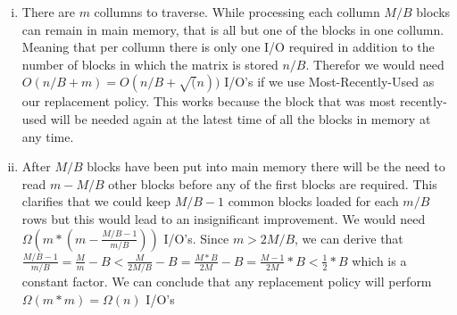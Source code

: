 \begin{enumerate}[(i)]
	\item
There are $m$ collumns to traverse. While processing each collumn $M/B$ blocks can remain in main memory, that is all but one of the blocks in one collumn. Meaning that per collumn there is only one I/O required in addition to the number of blocks in which the matrix is stored $n/B$. Therefor we would need $O(n/B + m) = O(n/B + \sqrt(n))$ I/O's if we use Most-Recently-Used as our replacement policy. This works because the block that was most recently-used will be needed again at the latest time of all the blocks in memory at any time.

	\item
After $M/B$ blocks have been put into main memory there will be the need to read $m - M/B$ other blocks before any of the first blocks are required. This clarifies that we could keep $M/B-1$ common blocks loaded for each $m/B$ rows but this would lead to an insignificant improvement. We would need $\Omega(m * (m - \frac{M/B-1}{m/B}))$ I/O's. 
Since $m > 2M/B$, we can derive that $\frac{M/B-1}{m/B} = \frac{M}{m} - B < \frac{M}{2M/B} - B = \frac{M * B}{2M} - B = \frac{M-1}{2M} * B < \frac{1}{2}*B$ which is a constant factor.
We can conclude that any replacement policy will perform $\Omega(m * m) = \Omega(n)$ I/O's
\end{enumerate}

